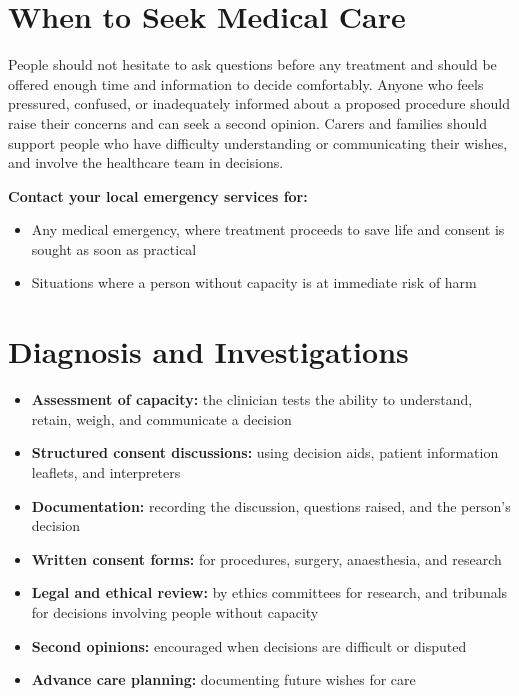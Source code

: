 \section*{When to Seek Medical Care}
People should not hesitate to ask questions before any treatment and should be offered enough time and information to decide comfortably. Anyone who feels pressured, confused, or inadequately informed about a proposed procedure should raise their concerns and can seek a second opinion. Carers and families should support people who have difficulty understanding or communicating their wishes, and involve the healthcare team in decisions.

\textbf{Contact your local emergency services for:}
\begin{itemize}
    \item Any medical emergency, where treatment proceeds to save life and consent is sought as soon as practical
    \item Situations where a person without capacity is at immediate risk of harm
\end{itemize}

\section*{Diagnosis and Investigations}
\begin{itemize}
    \item \textbf{Assessment of capacity:} the clinician tests the ability to understand, retain, weigh, and communicate a decision
    \item \textbf{Structured consent discussions:} using decision aids, patient information leaflets, and interpreters
    \item \textbf{Documentation:} recording the discussion, questions raised, and the person's decision
    \item \textbf{Written consent forms:} for procedures, surgery, anaesthesia, and research
    \item \textbf{Legal and ethical review:} by ethics committees for research, and tribunals for decisions involving people without capacity
    \item \textbf{Second opinions:} encouraged when decisions are difficult or disputed
    \item \textbf{Advance care planning:} documenting future wishes for care
\end{itemize}

